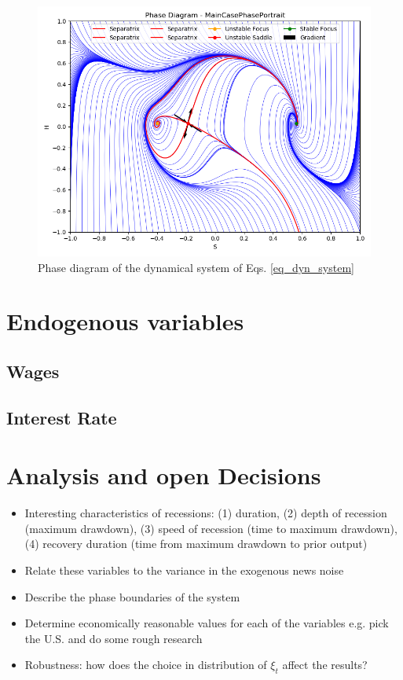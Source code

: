 \documentclass[11pt]{article}
\begin{document}
\begin{figure}[ht]
\begin{center}
\includegraphics[width=1.0\textwidth]{fig_phaseDiagram.png}
\caption{Phase diagram of the dynamical system of Eqs. \eqref{eq_dyn_system}}
\label{fig_phaseDiagram}
\end{center}
\end{figure}

\section{Endogenous variables}

\subsection{Wages}\label{sec_eq_wage}

\subsection{Interest Rate}\label{sec_eq_interest}

\section{Analysis and open Decisions}
\begin{itemize}
\item Interesting characteristics of recessions: (1) duration, (2) depth of recession (maximum drawdown), (3) speed of recession (time to maximum drawdown), (4) recovery duration (time from maximum drawdown to prior output)
\item Relate these variables to the variance in the exogenous news noise
\item Describe the phase boundaries of the system
\item Determine economically reasonable values for each of the variables e.g. pick the U.S. and do some rough research
\item Robustness: how does the choice in distribution of $\xi_t$ affect the results?
\end{itemize}
\end{document}
